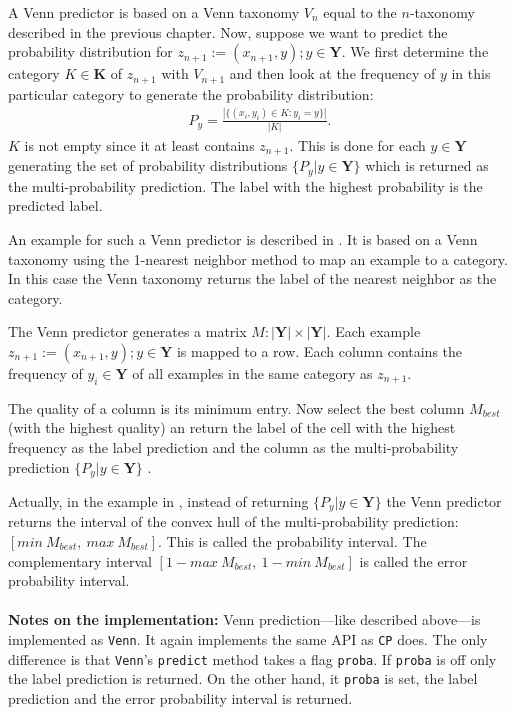 \documentclass[twoside,11pt]{article}
\begin{document}
A Venn predictor is based on a Venn taxonomy $V_n$ equal to
the $n$-taxonomy described in the previous chapter. Now,
suppose we want to predict the probability distribution for
$z_{n+1} := (x_{n+1}, y); y \in \textbf{Y}$.
We first determine the category $K \in \textbf{K}$ of
$z_{n+1}$ with $V_{n+1}$ and then look at the frequency of
$y$ in this particular category to generate the probability
distribution:
\begin{align*}
P_y = \frac{|\{(x_i,y_i) \in K: y_i = y\}|}{|K|}.
\end{align*}
$K$ is not empty since it at least contains $z_{n+1}$.
This is done for each $y \in \textbf{Y}$ generating the
set of probability distributions
$\{P_y|y \in \textbf{Y}\}$ which is returned as the
multi-probability prediction. The label with the highest
probability is the predicted label.

An example for such a Venn predictor is described in
\citet[Chapter 6.3]{alrw}. It is based on a Venn taxonomy
using the 1-nearest neighbor method to map an example to a
category.
In this case the Venn taxonomy returns the label of the
nearest neighbor as the category.

The Venn predictor generates a matrix
$M:|\textbf{Y}| \times |\textbf{Y}|$. Each example
$z_{n+1} := (x_{n+1},y);y \in \textbf{Y}$ is mapped to a
row.
Each column contains the frequency of $y_i \in \textbf{Y}$
of all examples in the same category as $z_{n+1}$.

The quality of a column is its minimum entry. Now select
the best column $M_{best}$ (with the highest quality) an
return the label of the cell with the highest frequency as
the label prediction and the column as the
multi-probability prediction $\{P_y|y\in \textbf{Y}\}$
\citep[see][Chapter 6.3]{alrw}.

Actually, in the example in \citet[Chapter 6.3]{alrw},
instead of returning $\{P_y|y\in \textbf{Y}\}$ the Venn
predictor returns the interval of the convex hull of the
multi-probability prediction:
$[min\ M_{best},\ max\ M_{best}]$.
This is called the probability interval. The complementary
interval $[1-max\ M_{best},\ 1-min\ M_{best}]$ is called
the error probability interval.
\\\\

\noindent
\textbf{Notes on the implementation:}
Venn prediction---like described above---is implemented as
\texttt{Venn}. It again implements the same API as
\texttt{CP} does. The only difference is that
\texttt{Venn}'s \texttt{predict} method takes a flag
\texttt{proba}. If \texttt{proba} is off only the label
prediction is returned. On the other hand, it
\texttt{proba} is set, the label prediction and the error
probability interval is returned.
\end{document}
